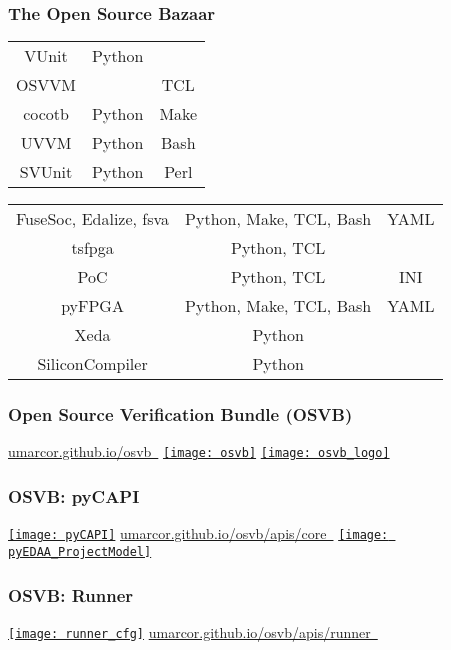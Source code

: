 \documentclass[xcolor={usenames,dvipsnames,svgnames}]{beamer}
\begin{document}
\begin{frame}
  \frametitle{The Open Source Bazaar}
  \centering
  \vfill
  \begin{tabular}{ccc}
  VUnit & Python & \\
  OSVVM & & TCL \\
  cocotb & Python & Make\\
  UVVM & Python & Bash\\
  SVUnit & Python & Perl \\
  \end{tabular}
  \vfill
  \begin{tabular}{ccc}
  FuseSoc, Edalize, fsva & Python, Make, TCL, Bash & YAML\\
  tsfpga & Python, TCL & \\
  PoC & Python, TCL & INI \\
  pyFPGA & Python, Make, TCL, Bash & YAML \\
  Xeda & Python & \\
  SiliconCompiler & Python & \\
  \end{tabular}


\end{frame}

\begin{frame}
\frametitle{Open Source Verification Bundle (OSVB)}
\centering
\Large \href{https://umarcor.github.io/osvb}{umarcor.github.io/osvb~\faBook}
\vfill
\href{https://umarcor.github.io/osvb/intro/index.html}{\texttt{[image: osvb]}}
\vfill
\href{https://umarcor.github.io/osvb}{\texttt{[image: osvb\_logo]}}
\end{frame}

\begin{frame}
\frametitle{OSVB: pyCAPI}
\centering
\vfill
\href{https://umarcor.github.io/osvb/apis/core.html}{\texttt{[image: pyCAPI]}}
\vfill
\Large \href{https://umarcor.github.io/osvb/apis/core.html}{umarcor.github.io/osvb/apis/core~\faBook}
\vfill
\Large \href{https://edaa-org.github.io/pyEDAA.ProjectModel/}{\texttt{[image: pyEDAA\_ProjectModel]}}
\end{frame}

\begin{frame}
  \frametitle{OSVB: Runner}
  \centering
  \vfill
  \href{https://umarcor.github.io/osvb/apis/runner.html}{\texttt{[image: runner\_cfg]}}
  \vfill
  \Large \href{https://umarcor.github.io/osvb/apis/runner.html}{umarcor.github.io/osvb/apis/runner~\faBook}
  \vfill
\end{frame}
\end{document}
